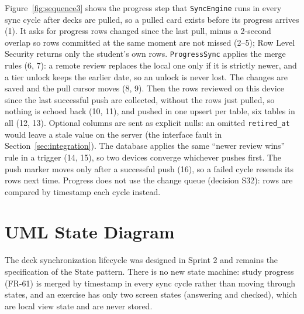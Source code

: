 \documentclass[12pt,letterpaper]{article}
\begin{document}
Figure~\ref{fig:sequence3} shows the progress step that \texttt{SyncEngine} runs in
every sync cycle after decks are pulled, so a pulled card exists before its progress
arrives (1). It asks for progress rows changed since the last pull, minus a 2-second
overlap so rows committed at the same moment are not missed (2--5); Row Level Security returns only the
student's own rows. \texttt{ProgressSync} applies the merge rules (6, 7): a remote
review replaces the local one only if it is strictly newer, and a tier unlock keeps
the earlier date, so an unlock is never lost. The changes are saved and the pull cursor
moves (8, 9). Then the rows reviewed on this device since the last successful push
are collected, without the rows just pulled, so nothing is echoed back (10, 11), and
pushed in one upsert per table, six tables in all (12, 13). Optional columns are sent as explicit nulls:
an omitted \texttt{retired\_at} would leave a stale value on the server (the interface
fault in Section~\ref{sec:integration}). The database applies the same ``newer review
wins'' rule in a trigger (14, 15), so two devices converge whichever pushes first.
The push marker moves only after a successful push (16), so a failed cycle resends
its rows next time. Progress does not use the change queue (decision S32): rows are
compared by timestamp each cycle instead.

\section{UML State Diagram}
The deck synchronization lifecycle was designed in Sprint 2 and remains the
specification of the State pattern. There is no new state machine: study progress
(FR-61) is merged by timestamp in every sync cycle rather than moving through states,
and an exercise has only two screen states (answering and checked), which are local
view state and are never stored.
\end{document}
